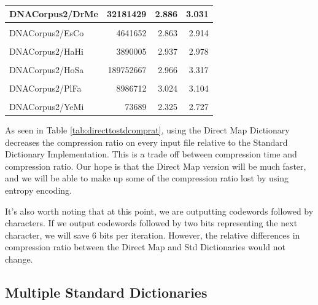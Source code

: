 \documentclass[12pt,twoside]{reedthesis}
\begin{document}
\begin{table}[!h]
{\begin{tabular}[t]{l|r|r|r}
\hline
DNACorpus2/DrMe & 32181429 & 2.886 & 3.031\\
\hline
\cellcolor{gray!6}{DNACorpus2/EnIn} & \cellcolor{gray!6}{26403087} & \cellcolor{gray!6}{2.938} & \cellcolor{gray!6}{3.067}\\
\hline
DNACorpus2/EsCo & 4641652 & 2.863 & 2.914\\
\hline
\cellcolor{gray!6}{DNACorpus2/GaGa} & \cellcolor{gray!6}{148532294} & \cellcolor{gray!6}{2.832} & \cellcolor{gray!6}{3.170}\\
\hline
DNACorpus2/HaHi & 3890005 & 2.937 & 2.978\\
\hline
\cellcolor{gray!6}{DNACorpus2/HePy} & \cellcolor{gray!6}{1667825} & \cellcolor{gray!6}{2.913} & \cellcolor{gray!6}{2.943}\\
\hline
DNACorpus2/HoSa & 189752667 & 2.966 & 3.317\\
\hline
\cellcolor{gray!6}{DNACorpus2/OrSa} & \cellcolor{gray!6}{43262523} & \cellcolor{gray!6}{2.882} & \cellcolor{gray!6}{3.058}\\
\hline
DNACorpus2/PlFa & 8986712 & 3.024 & 3.104\\
\hline
\cellcolor{gray!6}{DNACorpus2/ScPo} & \cellcolor{gray!6}{10652155} & \cellcolor{gray!6}{2.885} & \cellcolor{gray!6}{2.967}\\
\hline
DNACorpus2/YeMi & 73689 & 2.325 & 2.727\\
\hline
\end{tabular}}
\end{table}
As seen in Table \ref{tab:directtostdcomprat}, using the Direct Map Dictionary decreases the compression ratio on every input file relative to the Standard Dictionary Implementation. This is a trade off between compression time and compression ratio. Our hope is that the Direct Map version will be much faster, and we will be able to make up some of the compression ratio lost by using entropy encoding.

It's also worth noting that at this point, we are outputting codewords followed by characters. If we output codewords followed by two bits representing the next character, we will save 6 bits per iteration. However, the relative differences in compression ratio between the Direct Map and Std Dictionaries would not change.

\hypertarget{multiple-standard-dictionaries}{%
\subsection{Multiple Standard Dictionaries}\label{multiple-standard-dictionaries}}
\end{document}
